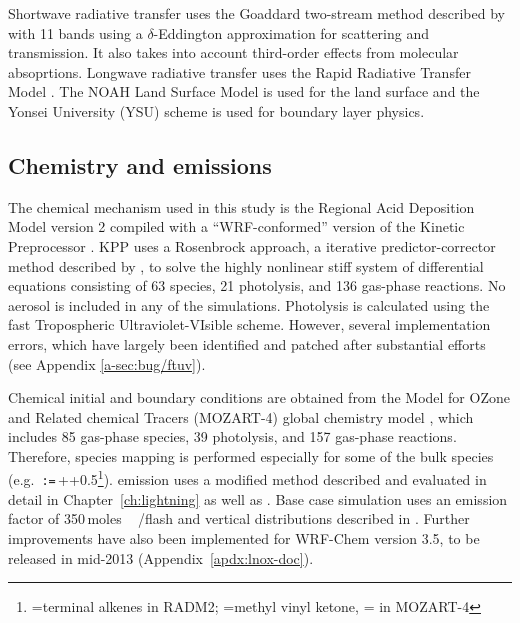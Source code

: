 	Shortwave radiative transfer uses the Goaddard two-stream method described by \citet{Chou:1998kx} with 11 bands using a $\delta$-Eddington approximation for scattering and transmission. It also takes into account third-order effects from molecular absoprtions. Longwave radiative transfer uses the Rapid Radiative Transfer Model \citep[RRTM;][]{Mlawer:1997vn}. The NOAH Land Surface Model \citep{Chen:2001ys} is used for the land surface and the Yonsei University (YSU) scheme  \citep{Hong:2006fk} is used for boundary layer physics.

\subsection{Chemistry and emissions}\label{ssec:2006/method/chem}

	The chemical mechanism used in this study is the Regional Acid Deposition Model version 2 \citep[RADM2;][]{Stockwell:1990ez} compiled with a ``WRF-conformed'' version of the Kinetic Preprocessor \citep[KPP;][]{Sandu:2006jl}. KPP uses a Rosenbrock approach, a iterative predictor-corrector method described by \citep{Hairer:1993zr}, to solve the highly nonlinear stiff system of differential equations consisting of 63 species, 21 photolysis, and 136 gas-phase reactions. No aerosol is included in any of the simulations. Photolysis is calculated using the fast Tropospheric Ultraviolet-VIsible \citep[FTUV;][]{Tie:2003ve} scheme. However, several implementation errors, which have largely been identified and patched after substantial efforts (see Appendix \ref{a-sec:bug/ftuv}).

	Chemical initial and boundary conditions are obtained from the Model for OZone and Related chemical Tracers (MOZART-4) global chemistry model \citep{Emmons:2010fk}, which includes 85 gas-phase species, 39 photolysis, and 157 gas-phase reactions. Therefore, species mapping is performed especially for some of the bulk species (e.g. \,\texttt{:=}\,++0.5\footnote{=terminal alkenes in RADM2; =methyl vinyl ketone, = in MOZART-4}). {\lnox} emission uses a modified \citet{Price:1992wb} method described and evaluated in detail in Chapter~\ref{ch:lightning} as well as \citet{Wong:2013vn}. Base case simulation uses an emission factor of 350\,\unit{moles\,/flash} and vertical distributions described in \citet{Ott:2010lo}. Further improvements have also been implemented for WRF-Chem version 3.5, to be released in mid-2013 (Appendix~\ref{apdx:lnox-doc}).
	
